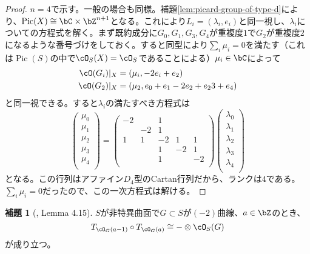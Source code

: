 \documentclass[uplatex, a4paper, dvipdfmx]{jsarticle}
\theoremstyle{definition}
\newtheorem{lemma}[theorem]{補題}
\DeclareMathOperator{\Pic}{\mathrm{Pic}}
\begin{document}
\begin{proof}
    $n=4$で示す。一般の場合も同様。補題\ref{lem:picard-group-of-type-d}により、$\Pic(X) \cong \bC \times \bZ^{n+1}$となる。これにより$L_i = (\lambda_i, e_i)$と同一視し、$\lambda_i$についての方程式を解く。まず既約成分に$G_0, G_1, G_{3}, G_4$が重複度$1$で$G_2$が重複度$2$になるような番号づけをしておく。すると同型により$\sum_i \mu_i = 0$を満たす（これは$\Pic(S)$の中で$\cO_S(X) = \cO_S$であることによる）$\mu_i \in \bC$によって
    \begin{align}
        \cO(G_i)\vert_X & = (\mu_i, -2e_i + e_2)                  \\
        \cO(G_2)\vert_X & = (\mu_2, e_0 + e_1 -2e_2 + e_23 + e_4)
    \end{align}
    と同一視できる。すると$\lambda_i$の満たすべき方程式は
    \begin{equation}
        \begin{pmatrix}
            \mu_0 \\
            \mu_1 \\
            \mu_2 \\
            \mu_3 \\
            \mu_4 \\
        \end{pmatrix}
        =
        \begin{pmatrix}
            -2 &    & 1  &    &    \\
               & -2 & 1  &    &    \\
            1  & 1  & -2 & 1  & 1  \\
               &    & 1  & -2 & 1  \\
               &    & 1  &    & -2 \\
        \end{pmatrix}
        \begin{pmatrix}
            \lambda_0 \\
            \lambda_1 \\
            \lambda_2 \\
            \lambda_3 \\
            \lambda_4 \\
        \end{pmatrix}
    \end{equation}
    となる。この行列はアファイン$D_4$型のCartan行列だから、ランクは$4$である。$\sum_i \mu_i = 0$だったので、この一次方程式は解ける。
\end{proof}
\begin{lemma}[{\cite{MR2198807}, Lemma 4.15}]\label{lem:composition-of-twists}
    $S$が非特異曲面で$G \subset S$が$(-2)$曲線、$a \in \bZ$のとき、
    \begin{equation}
        T_{\cO_G(a-1)}\circ T_{\cO_G(a)} \cong -\otimes \cO_S(G)
    \end{equation}
    が成り立つ。
\end{lemma}
\end{document}
